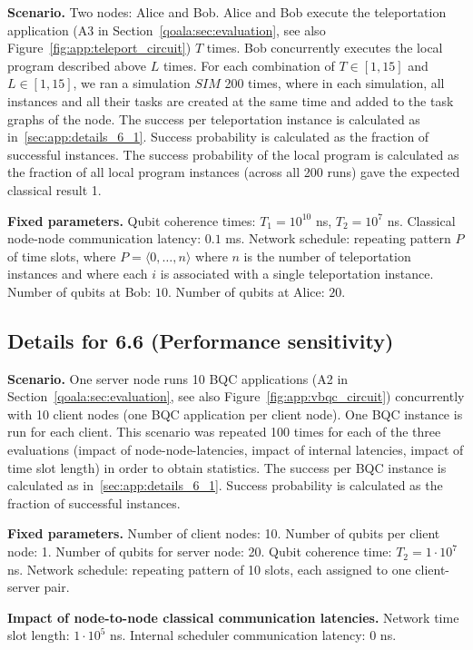 \textbf{Scenario.}
Two nodes: Alice and Bob.
Alice and Bob execute the teleportation application (A3 in Section~\ref{qoala:sec:evaluation}, see also Figure~\ref{fig:app:teleport_circuit}) $T$ times.
Bob concurrently executes the local program described above $L$ times.
For each combination of $T \in [1, 15]$ and $L \in [1, 15]$, we ran a simulation $SIM$ 200 times, where in each simulation, all instances and all their tasks are created at the same time and added to the task graphs of the node.
The success per teleportation instance is calculated as in~\ref{sec:app:details_6_1}.
Success probability is calculated as the fraction of successful instances.
The success probability of the local program is calculated as the fraction of all local program instances (across all 200 runs) gave the expected classical result 1.

\textbf{Fixed parameters.}
Qubit coherence times: $T_1 = 10^{10}$ ns, $T_2 = 10^7$ ns.
Classical node-node communication latency: $0.1$ ms.
Network schedule: repeating pattern $P$ of time slots, where $P = \langle 0, \dots, n \rangle$ where $n$ is the number of teleportation instances and where each $i$ is associated with a single teleportation instance.
Number of qubits at Bob: $10$.
Number of qubits at Alice: $20$.


\subsection{Details for 6.6 (Performance sensitivity)}
\textbf{Scenario.}
One server node runs 10 BQC applications (A2 in Section~\ref{qoala:sec:evaluation}, see also Figure~\ref{fig:app:vbqc_circuit}) concurrently with 10 client nodes (one BQC application per client node).
One BQC instance is run for each client.
This scenario was repeated 100 times for each of the three evaluations (impact of node-node-latencies, impact of internal latencies, impact of time slot length) in order to obtain statistics.
The success per BQC instance is calculated as in~\ref{sec:app:details_6_1}.
Success probability is calculated as the fraction of successful instances.

\textbf{Fixed parameters.}
Number of client nodes: 10.
Number of qubits per client node: 1.
Number of qubits for server node: 20.
Qubit coherence time: $T_2 = 1\cdot 10^7$ ns.
Network schedule: repeating pattern of 10 slots, each assigned to one client-server pair.

\textbf{Impact of node-to-node classical communication latencies.}
Network time slot length: $1\cdot 10^5$ ns.
Internal scheduler communication latency: $0$ ns.

